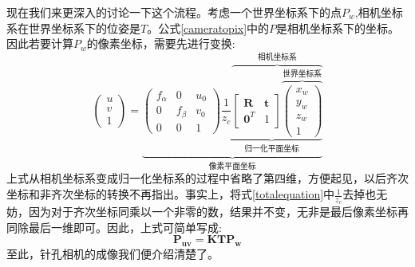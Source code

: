 现在我们来更深入的讨论一下这个流程。考虑一个世界坐标系下的点$P_w$,相机坐标系在世界坐标系下的位姿是$T$。公式\ref{cameratopix}中的$P$是相机坐标系下的坐标。因此若要计算$P_w$的像素坐标，需要先进行变换:
\begin{equation}
\left( \begin{array}{c}{u} \\ {v} \\ {1}\end{array}\right)=
\underbrace{
\left( \begin{array}{ccc}{f_{\alpha}} & {0} & {u_{0}} \\ {0} & {f_{\beta}} & {v_{0}} \\ {0} & {0} & {1}\end{array}\right)
\underbrace{\frac{1}{z_{c}}\overbrace{\left[ \begin{array}{cc}{\boldsymbol{R}} & {\boldsymbol{t}} \\ {\boldsymbol{0}^{T}} & {1}\end{array}\right]
\overbrace{\left( \begin{array}{c}{x_{w}} \\ {y_{w}} \\ {z_{w}} \\ {1}\end{array}\right)}^\text{世界坐标系}}^\text{相机坐标系}}_\text{归一化平面坐标}}_\text{像素平面坐标}\label{totalequation}
\end{equation}
上式从相机坐标系变成归一化坐标系的过程中省略了第四维，方便起见，以后齐次坐标和非齐次坐标的转换不再指出。事实上，将式\ref{totalequation}中$\frac{1}{z_c}$去掉也无妨，因为对于齐次坐标同乘以一个非零的数，结果并不变，无非是最后像素坐标再同除最后一维即可。因此，上式可简单写成:
\begin{equation}
	\boldsymbol{P_{uv}=KTP_w}
\end{equation}
至此，针孔相机的成像我们便介绍清楚了。
